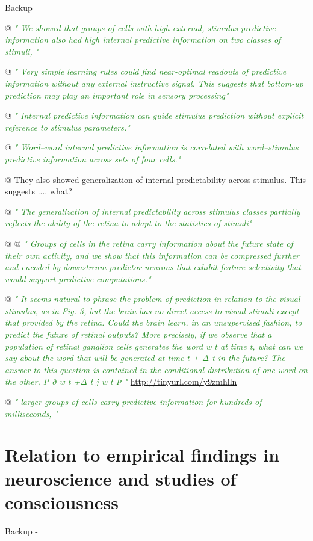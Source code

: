\documentclass[utf8]{article}
\newenvironment{ants}
			{
			 \begin{easylist}[itemize]
		 	}
			{
			\end{easylist}
			} %
\newcommand{\rewrite}[1]{\textcolor{ForestGreen}{\textit{"#1"}}\newline}
\newenvironment{backup}
    {
        
        \begin{tcolorbox}[enhanced,
            title=-,
            size=small,
            colbacktitle=black!70!white,
            colback=black!10!white,            
            drop fuzzy shadow,
            fontupper=\small,
            boxrule=0.4pt,
            sharp corners]
            Backup
        \end{tcolorbox}
    }
    {
        \begin{tcolorbox}[enhanced,
            halign=flush right,
            halign title=right,
            size=small,
            colbacktitle=black!10!white,
            colback=black!70!white,
            drop fuzzy shadow,
            fontupper=\small,
            boxrule=0.4pt,
            colupper=White,
            sharp corners]
            Backup -
        \end{tcolorbox}    
    }
\begin{document}
\begin{backup}
\begin{ants}
			@ \rewrite{
				We showed that groups of cells with high external, stimulus-predictive information also had high internal predictive information on two classes of stimuli, }

			@ \rewrite{
				Very simple learning rules could find near-optimal readouts of predictive information without any external instructive signal. This suggests that bottom-up prediction may play an important role in sensory processing}

			@ \rewrite{
				Internal predictive information can guide stimulus prediction without explicit reference to stimulus parameters.}

			@ \rewrite{
				Word–word internal predictive information is correlated with word–stimulus predictive information across sets of four cells.}

			@ They also showed generalization of internal predictability across stimulus. This suggests .... what?

			@ \rewrite{
				The generalization of internal predictability across stimulus classes partially reflects the ability of the retina to adapt to the statistics of stimuli}


			@ \cite{Palmer2015}
			@ \rewrite{
				Groups of cells in the retina carry information about the future state of their own activity, and we show that this information can be compressed further and encoded by downstream predictor neurons that exhibit feature selectivity that would support predictive computations.}

			@ \rewrite{
				It seems natural to phrase the problem of prediction in relation to the visual stimulus, as in Fig. 3, but the brain has no direct access to visual stimuli except that provided by the retina. Could the brain learn, in an unsupervised fashion, to predict the future of retinal outputs? More precisely, if we observe that a population of retinal ganglion cells generates the word w t at time t, what can we say about the word that will be generated at time t + Δ t in the future? The answer to this question is contained in the conditional distribution of one word on the other, P ð w t +Δ t j w t Þ } \url{http://tinyurl.com/y9zmhlln}

			@ \rewrite{
				larger groups of cells carry predictive information for hundreds of milliseconds, }

		\end{ants}




	\section*{Relation to empirical findings in neuroscience and studies of consciousness}


\end{backup}
\end{document}
